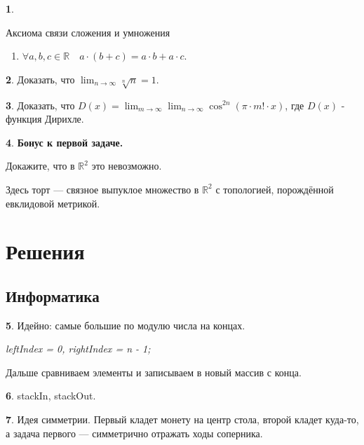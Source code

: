 \documentclass[14pt, a4paper]{extarticle}
\theoremstyle{definition}
\newtheorem{problem}{}
\theoremstyle{definition}
\theoremstyle{remark}
\numberwithin{equation}{section}
\newcommand{\R}{\ensuremath{\mathbb{R}}}
\begin{document}
\begin{problem}
\begin{multicols}{2}
{            Аксиома связи сложения и умножения
            \begin{enumerate}
                \setcounter{enumi}{\theaxiomscounter}
                \item $\forall a, b, c \in \R \quad a \cdot (b + c) = a \cdot b + a \cdot c$.
            \end{enumerate}
        }

      \end{multicols}
\end{problem}

\begin{problem}
    Доказать, что $\displaystyle\lim_{n\to\infty}{\sqrt[n]{n}} = 1.$
\end{problem}

\begin{problem}
    Доказать, что $D(x) = \displaystyle\lim_{m\to\infty}{\lim_{n\to\infty}
    {\cos^{2n}(\pi \cdot m! \cdot x)}}$, где $D(x)$ - функция Дирихле.
\end{problem}

\begin{problem}
    \textbf{Бонус к первой задаче.}

    Докажите, что в $\R^2$ это невозможно.

    Здесь торт --- связное выпуклое множество в $\R^2$ 
    с топологией, порождённой евклидовой метрикой.
\end{problem}

\newpage
\section*{Решения}
\subsection*{Информатика}
\setcounter{problem}{0}

\begin{problem}
    Идейно: самые большие по модулю числа на концах.

    \textit{leftIndex = 0, rightIndex = n - 1;}

    Дальше сравниваем элементы и записываем в новый массив с конца.
\end{problem}

\begin{problem}
    stackIn, stackOut.
\end{problem}

\begin{problem}
    Идея симметрии. Первый кладет монету на центр стола, второй кладет
    куда-то, а задача первого --- симметрично отражать ходы соперника.
\end{problem}
\end{document}

